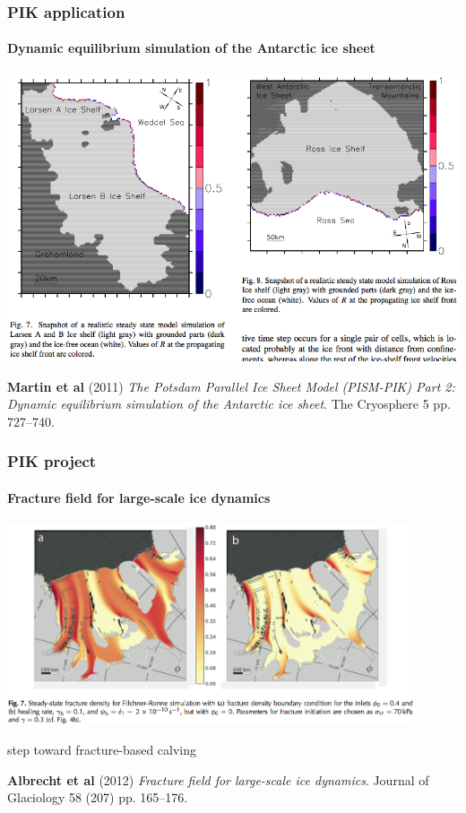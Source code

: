 \documentclass[hide notes,intlimits]{beamer}
\begin{document}
\begin{frame}
  \frametitle{PIK application}
  \framesubtitle{Dynamic equilibrium simulation of the Antarctic ice sheet}

  \begin{center}
    \includegraphics[height=0.7\textheight]{moving-calving-front.png}
  \end{center}
  \begin{flushleft}
    \tiny \textbf{Martin et al} (2011) \emph{The
        Potsdam Parallel Ice Sheet Model (PISM-PIK) Part 2: Dynamic
        equilibrium simulation of the Antarctic ice sheet}. The Cryosphere 5
      pp. 727--740.
  \end{flushleft}
\end{frame}

\begin{frame}
  \frametitle{PIK project}
  \framesubtitle{Fracture field for large-scale ice dynamics}
  \begin{center}
    \includegraphics[width=0.9\textwidth]{fracture-density.png}
  \end{center}

  \begin{center}
    step toward fracture-based calving
  \end{center}

  \begin{flushleft}
    \tiny \textbf{Albrecht et al} (2012) \emph{Fracture field for
      large-scale ice dynamics}. Journal of Glaciology 58 (207) pp. 165--176.
 \end{flushleft}
\end{frame}
\end{document}
